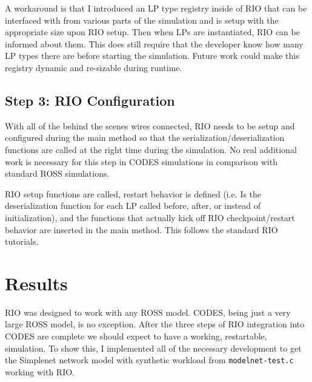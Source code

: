 \documentclass[letterpaper, 11 pt, conference]{IEEEtran}
\begin{document}
A workaround is that I introduced an LP type registry inside of RIO that can be interfaced with from various parts of the simulation and is setup with the appropriate size upon RIO setup. Then when LPs are instantiated, RIO can be informed about them. This does still require that the developer know how many LP types there are before starting the simulation. Future work could make this registry dynamic and re-sizable during runtime.

\subsection{Step 3: RIO Configuration}
With all of the behind the scenes wires connected, RIO needs to be setup and configured during the main method so that the serialization/deserialization functions are called at the right time during the simulation. No real additional work is necessary for this step in CODES simulations in comparison with standard ROSS simulations.

RIO setup functions are called, restart behavior is defined (i.e. Is the deserialization function for each LP called before, after, or instead of initialization), and the functions that actually kick off RIO checkpoint/restart behavior are inserted in the main method. This follows the standard RIO tutorials.

\section{Results}

RIO was designed to work with any ROSS model. CODES, being just a very large ROSS model, is no exception. After the three steps of RIO integration into CODES are complete we should expect to have a working, restartable, simulation. To show this, I implemented all of the necessary development to get the Simplenet network model with synthetic workload from \texttt{modelnet-test.c} working with RIO.
\end{document}
